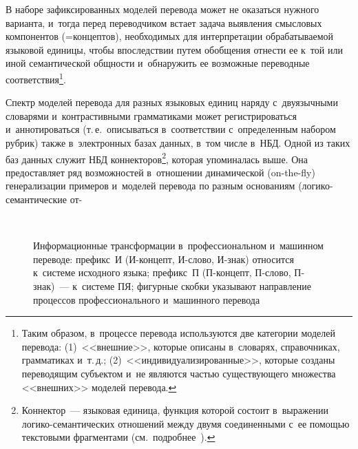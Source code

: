 \begin{multicols}{2}
  В наборе зафиксированных моделей перевода может не оказаться нужного 
варианта, и~тогда перед переводчиком встает задача выявления смысловых 
компонентов (=\;концептов), необходимых для интерпретации обрабатываемой 
языковой единицы, чтобы впоследствии путем обобщения отнести ее к~той или 
иной семантической общности и~обнаружить ее возможные переводные 
соответствия\footnote{Таким образом, в~процессе перевода используются 
две категории моделей 
перевода: (1)~<<внешние>>, которые описаны в~словарях,
 справочниках, грамматиках и~т.\,д.; 
(2)~<<индивидуализированные>>, которые созданы переводящим субъектом и~не являются частью 
существующего множества <<внешних>> моделей перевода.}.

  



  
     Спектр моделей перевода для разных языковых единиц наряду 
с~двуязычными словарями и~контрастивными грамматиками может 
регистрироваться и~аннотироваться (т.\,е.\ описываться в~соответствии 
с~определенным набором рубрик) также в~электронных базах данных, в~том 
числе в~НБД. Одной из таких баз данных служит НБД 
коннекторов\footnote{Коннектор~--- языковая единица, функция которой состоит в~выражении 
логико-семантических отношений между двумя соединенными с~ее помощью текстовыми фрагментами 
(см.\ подробнее~\cite{18-nur, 19-nur, 20-nur}).}, которая упоминалась выше. Она 
предоставляет ряд возможностей в~отношении динамической (on-the-fly) 
генерализации примеров и~моделей перевода
по разным основаниям 
(ло\-ги\-ко-се\-ман\-ти\-че\-ские от-\linebreak\vspace*{-12pt}

\pagebreak

\end{multicols}

\begin{figure*}
\vspace*{1pt}
 \begin{center}
 \mbox{%
 \epsfxsize=146.085mm 
 }
 \end{center}
\vspace*{3pt}

{\small Информационные трансформации в~профессиональном и~машинном переводе:
префикс~И (И-кон\-цепт, И-сло\-во, И-знак) относится к~системе 
исходного языка; префикс~П (П-кон\-цепт, П-сло\-во, П-знак)~--- к~системе 
ПЯ; фигурные скобки указывают направление процессов 
профессионального и~машинного перевода}
\vspace*{-2pt}
\end{figure*}

